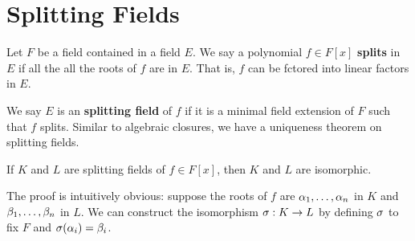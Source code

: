 \section{Splitting Fields}
Let $F$ be a field contained in a field $E$. We say a polynomial $f \in F[x]$ \textbf{splits} in $E$ if all the all the roots of $f$ are in $E$. That is, $f$ can be fctored into linear factors in $E$.

We say $E$ is an \textbf{splitting field} of $f$ if it is a minimal field extension of $F$ such that $f$ splits. Similar to algebraic closures, we have a uniqueness theorem on splitting fields.
\begin{center}
    If $K$ and $L$ are splitting fields of $f \in F[x]$, then $K$ and $L$ are isomorphic.
\end{center}
The proof is intuitively obvious: suppose the roots of $f$ are $\alpha_1, \dots, \alpha_n$ in $K$ and $\beta_1, \dots, \beta_n$ in $L$. We can construct the isomorphism $\sigma: K \rightarrow L$ by defining $\sigma$ to fix $F$ and $\sigma(\alpha_i) = \beta_i$.
